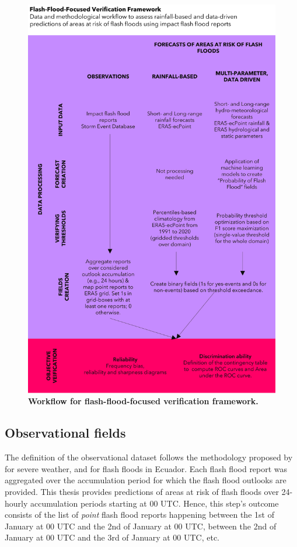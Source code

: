 \begin{figure}[htbp]
\centering
\includegraphics[width=\textwidth]{workflow_verif_framework.png}
\caption{\textbf{Workflow for flash-flood-focused verification framework.}}
\label{fig:sed_reports}
\end{figure}

\subsection{Observational fields}
\label{obs_field}
The definition of the observational dataset follows the methodology proposed by \citep{Tsonevsky_2018} for severe weather, and \citep{Pillosu_2024} for flash floods in Ecuador. Each flash flood report was aggregated over the accumulation period for which the flash flood outlooks are provided. This thesis provides predictions of areas at risk of flash floods over 24-hourly accumulation periods starting at 00 UTC. Hence, this step's outcome consists of the list of \textit{point} flash flood reports happening between the 1st of January at 00 UTC and the 2nd of January at 00 UTC, between the 2nd of January at 00 UTC and the 3rd of January at 00 UTC, etc. 

